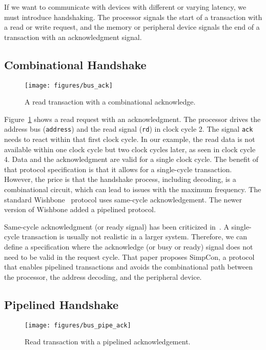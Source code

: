 \documentclass[%
    10pt,
    headinclude, footexclude,
    openright, %
    notitlepage,
    cleardoubleempty,
    headsepline,
    pointlessnumbers,
    bibtotoc, idxtotoc,
    ]{scrbook}
\newcommand{\code}[1]{{\lstinline[basicstyle=\small\ttfamily]{#1}}}
\begin{document}
If we want to communicate with devices with different or varying latency, we must
introduce handshaking. The processor signals the start of a
transaction with a read or write request, and the memory or peripheral device signals the end of a transaction with
an acknowledgment signal.

\subsection{Combinational Handshake}

\begin{figure}
  \centering
  \texttt{[image: figures/bus\_ack]}
  \caption{A read transaction with a combinational acknowledge.}
  \label{fig:bus_ack}
\end{figure}

Figure~\ref{fig:bus_ack} shows a read request with an acknowledgment.
The processor drives the address bus (\code{address}) and the read
signal (\code{rd}) in clock cycle 2. The signal \code{ack} needs to react
within that first clock cycle. In our example, the read data is not available within
one clock cycle but two clock cycles later, as seen in clock cycle 4.
Data and the acknowledgment are valid for a single clock cycle.
The benefit of that protocol specification is that it allows for a single-cycle transaction.
However, the price is that the handshake process, including decoding, is a combinational
circuit, which can lead to issues with the maximum frequency.
The standard Wishbone~\cite{soc:wishbone} protocol uses same-cycle
acknowledgement. The newer version of Wishbone added a pipelined
protocol.

Same-cycle acknowledgment (or ready signal) has been criticized in~\cite{simpcon}.
A single-cycle transaction is usually not realistic in a larger system. Therefore,
we can define a specification where the acknowledge (or busy or ready) signal
does not need to be valid in the request cycle.
That paper proposes SimpCon, a protocol that enables pipelined transactions and
avoids the combinational path between the processor, the address decoding, and the
peripheral device.

\subsection{Pipelined Handshake}

\begin{figure}
  \centering
  \texttt{[image: figures/bus\_pipe\_ack]}
  \caption{Read transaction with a pipelined acknowledgement.}
  \label{fig:bus_pipe_ack}
\end{figure}
\end{document}
